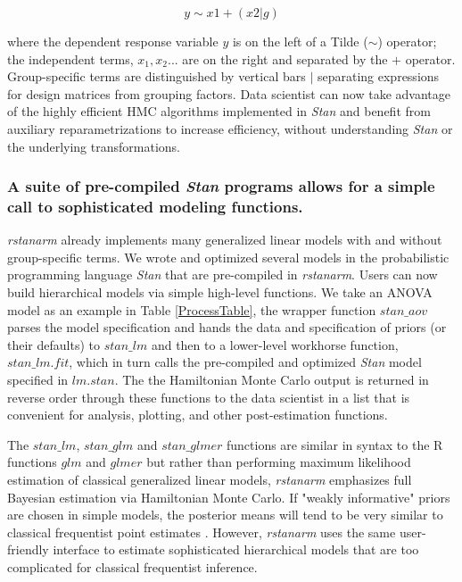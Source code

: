 \documentclass[11pt,notitlepage]{article}
\begin{document}
\begin{figure}
\vspace{-30pt}
\begin{equation}
y \sim x1 +(x2|g)
\end{equation}
\vspace{-40pt}
\end{figure}

where the dependent response variable $y$ is on the left of a Tilde ($\sim$) operator; 
the independent terms, $x_1, x_2...$ are on the right and separated by the $+$ 
operator. Group-specific terms are distinguished by vertical bars $|$ separating expressions for design matrices from grouping factors. Data 
scientist can now take advantage of the highly efficient HMC algorithms implemented in \textit{Stan} and benefit from auxiliary reparametrizations to 
increase efficiency, without understanding \textit{Stan} or the underlying transformations.

\subsubsection*{A suite of pre-compiled \textit{Stan} programs allows for a simple call to sophisticated modeling functions.} 
\textit{rstanarm} already implements many generalized linear 
models with and without group-specific terms. We wrote and optimized several models 
in the probabilistic programming language \textit{Stan} that are
pre-compiled in \textit{rstanarm}. Users can now build hierarchical models via simple high-level functions. 
We take an ANOVA model as an example in Table \ref{ProcessTable}, the wrapper function $stan\_aov$ parses the 
model specification and hands the data and specification of priors (or their defaults) to $stan\_lm$ and 
then to a lower-level workhorse function, $stan\_lm.fit$, which in turn 
calls the pre-compiled and optimized \textit{Stan} model specified in 
$lm.stan$. The the Hamiltonian Monte Carlo output is returned in reverse order
through these functions to the data scientist in a list that is convenient 
for analysis, plotting, and other post-estimation functions.

The $stan\_lm$, $stan\_glm$ and $stan\_glmer$ functions are similar in syntax to the R functions $glm$ 
and $glmer$ but rather than performing maximum likelihood estimation of classical generalized linear models, 
\textit{rstanarm} emphasizes full Bayesian estimation via Hamiltonian Monte Carlo. If "weakly informative" 
priors are chosen in simple models, the posterior means will tend to be very similar to classical frequentist point 
estimates \cite{Gelman-Hill_2014}. However, \textit{rstanarm} uses the same user-friendly interface to estimate 
sophisticated hierarchical models that are too complicated for classical frequentist inference.
\end{document}
